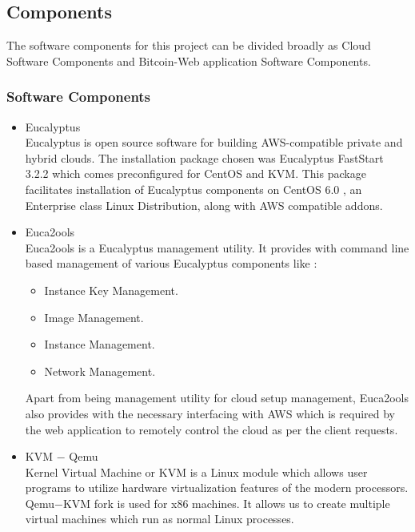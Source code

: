 \documentclass[a4page,12pt]{article}
\begin{document}
\subsection{Components}
The software components for this project can be divided broadly as Cloud Software Components and Bitcoin-Web application Software Components.\\
\subsubsection{Software Components}
\begin{itemize}
\item Eucalyptus\\
Eucalyptus is open source software for building AWS-compatible private and hybrid clouds. The installation package chosen was Eucalyptus FastStart 3.2.2 which comes preconfigured for CentOS and KVM. This package facilitates installation of Eucalyptus components on CentOS 6.0 , an Enterprise class Linux Distribution, along with AWS compatible addons.
\item Euca2ools\\
Euca2ools is a Eucalyptus management utility. It provides with command line based management of various Eucalyptus components like :
\begin{itemize}
\item Instance Key Management.
\item Image Management.
\item Instance Management.
\item Network Management.
\end{itemize}
Apart from being management utility for cloud setup management, Euca2ools also provides with the necessary interfacing with AWS which is required by the web application to remotely control the cloud as per the client requests.
\item KVM $-$ Qemu\\
Kernel Virtual Machine or KVM is a Linux module which allows user programs to utilize hardware virtualization features of the modern processors. Qemu$-$KVM fork is used for x86 machines. It allows us to create multiple virtual machines which run as normal Linux processes.
\end{itemize}
\end{document}
